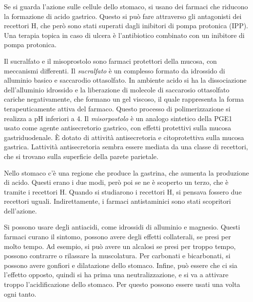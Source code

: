 
Se si guarda l'azione sulle cellule dello stomaco, si usano dei farmaci
che riducono la formazione di acido gastrico. Questo si può fare
attraverso gli antagonisti dei recettori H, che però sono stati
superati dagli inibitori di pompa protonica (IPP).
Una terapia topica in caso di ulcera è l'antibiotico combinato con un inibitore di pompa protonica.

Il sucralfato e il misoprostolo sono farmaci protettori della mucosa, con meccanismi differenti.
Il \emph{sucralfato} è un complesso formato da idrossido di alluminio basico e saccarodio ottasolfato. In ambiente acido si ha la dissociazione dell'alluminio idrossido e la liberazione di molecole di saccarosio ottasolfato cariche negativamente, che formano un gel viscoso, il quale rappresenta la forma terapeuticamente attiva del farmaco. Questo processo di polimerizzazione si realizza a pH inferiori a 4.
Il  \emph{misorpostolo} è un analogo sintetico della PGE1 usato come agente antisecretorio gastrico, con effetti protettivi sulla mucosa gastriduodenale. È dotato di attività antisecretoria e citoprotettiva sulla mucosa gastrica. Lattività antisecretoria sembra essere mediata da una classe di recettori, che si trovano sulla superficie della parete parietale.


Nello stomaco c'è una regione che produce la gastrina, che aumenta la
produzione di acido. Questi erano i due modi, però poi se ne è scoperto
un terzo, che è tramite i recettori H.
Quando si studiarono i recettori H, si pensava fossero due recettori uguali.
Indirettamente, i farmaci antistaminici sono stati scopritori
dell'azione.

Si possono usare degli antiacidi, come idrossidi di alluminio e
magnesio. Questi farmaci curano il sintomo, possono avere degli effetti
collaterali, se presi per molto tempo.
Ad esempio, si può avere un alcalosi se presi per troppo tempo, possono
contrarre o rilassare la muscolatura.
Per carbonati e bicarbonati, si possono avere gonfiori e dilatazione
dello stomaco.
Infine, può essere che ci sia l'effetto opposto, quindi si ha prima una
neutralizzazione, e si va a attivare troppo l'acidificazione dello
stomaco. Per questo possono essere usati una volta ogni tanto.

